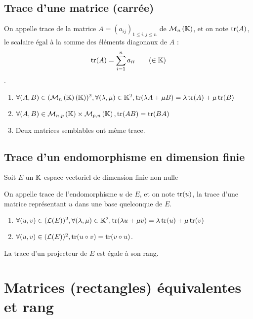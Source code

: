 \subsection{Trace d’une matrice (carrée)}
\begin{defi}
    On appelle trace de la matrice \(A = (a_{ij} )_{1\leq i,j\leq n}\) de \(\M{n}\), et on note \(\operatorname{tr}(A)\), le scalaire égal à la somme des éléments diagonaux de \(A\) :
\[\operatorname{tr}(A) = \sum^n_{i=1}a_{ii}  \qquad(\in \mathbb{K})\] .
\end{defi}

\begin{prop}
    \begin{enumerate}
        \item  \(\forall(A, B) \in (\M{n}(\K))^2 , \forall(\lambda, \mu) \in \K^2, \tr(\lambda A + \mu B) = \lambda \tr(A) + \mu \tr(B)\)
        \item  \(\forall(A, B) \in \M{n,p} \times \M{p,n}, \tr(AB) = \tr(BA)\)
        \item  Deux matrices semblables ont même trace.
    \end{enumerate}
\end{prop}
\subsection{Trace d’un endomorphisme en dimension finie}
Soit \(E\) un \(\mathbb{K}\)-espace vectoriel de dimension finie non nulle
\begin{defi}
    On appelle trace de l’endomorphisme \(u\) de \(E\), et on note \(\operatorname{tr}(u)\), la trace d’une matrice représentant \(u\) dans une base quelconque de \(E\).
\end{defi}
\begin{prop}
    \begin{enumerate}
        \item \(\forall(u, v) \in (\mathcal{L}(E))^2 , \forall(\lambda, \mu) \in \mathbb{K}^2, \operatorname{tr}(\lambda u + \mu v) = \lambda \operatorname{tr}(u) + \mu \operatorname{tr}(v)\)
        \item\( \forall(u, v) \in (\mathcal{L}(E))^2 , \operatorname{tr}(u \circ v) = \operatorname{tr}(v \circ u)\).
    \end{enumerate}
\end{prop}
\begin{defprop}
    La trace d’un projecteur de \(E\) est égale à son rang.
\end{defprop}

\section{Matrices (rectangles) équivalentes et rang}
